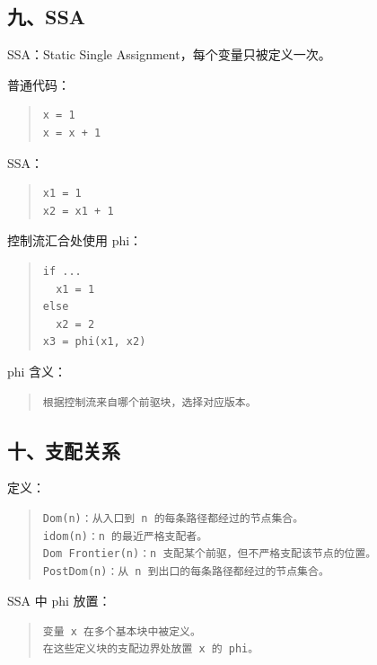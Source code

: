 \documentclass[UTF8,zihao=-4]{ctexart}
\begin{document}
\subsection{九、SSA}


SSA：Static Single Assignment，每个变量只被定义一次。


普通代码：


\begin{quote}
\footnotesize
\begin{verbatim}
x = 1
x = x + 1
\end{verbatim}
\end{quote}


SSA：


\begin{quote}
\footnotesize
\begin{verbatim}
x1 = 1
x2 = x1 + 1
\end{verbatim}
\end{quote}


控制流汇合处使用 phi：


\begin{quote}
\footnotesize
\begin{verbatim}
if ...
  x1 = 1
else
  x2 = 2
x3 = phi(x1, x2)
\end{verbatim}
\end{quote}


phi 含义：


\begin{quote}
\footnotesize
\begin{verbatim}
根据控制流来自哪个前驱块，选择对应版本。
\end{verbatim}
\end{quote}


\subsection{十、支配关系}


定义：


\begin{quote}
\footnotesize
\begin{verbatim}
Dom(n)：从入口到 n 的每条路径都经过的节点集合。
idom(n)：n 的最近严格支配者。
Dom Frontier(n)：n 支配某个前驱，但不严格支配该节点的位置。
PostDom(n)：从 n 到出口的每条路径都经过的节点集合。
\end{verbatim}
\end{quote}


SSA 中 phi 放置：


\begin{quote}
\footnotesize
\begin{verbatim}
变量 x 在多个基本块中被定义。
在这些定义块的支配边界处放置 x 的 phi。
\end{verbatim}
\end{quote}
\end{document}
